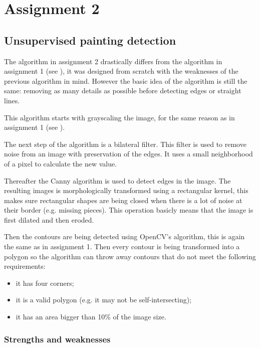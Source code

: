\chapter{Assignment 2}
\section{Unsupervised painting detection}
\label{sec:unsupervised_painting_detection}
The algorithm in assignment 2 drastically differs from the algorithm in assignment 1 (see ), it was designed from scratch with the weaknesses of the previous algorithm in mind. However the basic idea of the algorithm is still the same: removing as many details as possible before detecting edges or straight lines.


This algorithm starts with grayscaling the image, for the same reason as in assignment 1 (see ).

The next step of the algorithm is a bilateral filter. This filter is used to remove noise from an image with preservation of the edges. It uses a small neighborhood of a pixel to calculate the new value. \cite{BilateralFilter}

Thereafter the Canny algorithm is used to detect edges in the image. The resulting images is morphologically transformed using a rectangular kernel, this makes sure rectangular shapes are being closed when there is a lot of noise at their border (e.g. missing pieces). This operation basicly means that the image is first dilated and then eroded.

Then the contours are being detected using OpenCV's algorithm, this is again the same as in assignment 1. Then every contour is being transformed into a polygon so the algorithm can throw away contours that do not meet the following requirements:

\begin{itemize}
  \item it has four corners;
  \item it is a valid polygon (e.g. it may not be self-intersecting);
  \item it has an area bigger than 10\% of the image size.
\end{itemize}


\subsection{Strengths and weaknesses}

